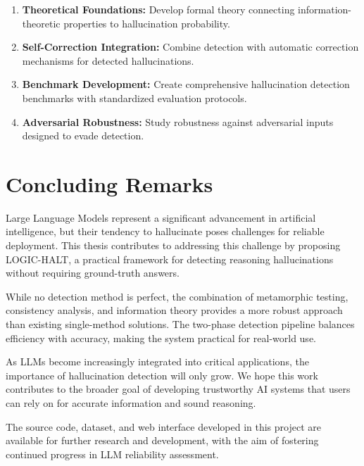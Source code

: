 \begin{enumerate}
    \item \textbf{Theoretical Foundations:} Develop formal theory connecting information-theoretic properties to hallucination probability.

    \item \textbf{Self-Correction Integration:} Combine detection with automatic correction mechanisms for detected hallucinations.

    \item \textbf{Benchmark Development:} Create comprehensive hallucination detection benchmarks with standardized evaluation protocols.

    \item \textbf{Adversarial Robustness:} Study robustness against adversarial inputs designed to evade detection.
\end{enumerate}

\section{Concluding Remarks}

Large Language Models represent a significant advancement in artificial intelligence, but their tendency to hallucinate poses challenges for reliable deployment. This thesis contributes to addressing this challenge by proposing LOGIC-HALT, a practical framework for detecting reasoning hallucinations without requiring ground-truth answers.

While no detection method is perfect, the combination of metamorphic testing, consistency analysis, and information theory provides a more robust approach than existing single-method solutions. The two-phase detection pipeline balances efficiency with accuracy, making the system practical for real-world use.

As LLMs become increasingly integrated into critical applications, the importance of hallucination detection will only grow. We hope this work contributes to the broader goal of developing trustworthy AI systems that users can rely on for accurate information and sound reasoning.

The source code, dataset, and web interface developed in this project are available for further research and development, with the aim of fostering continued progress in LLM reliability assessment.
